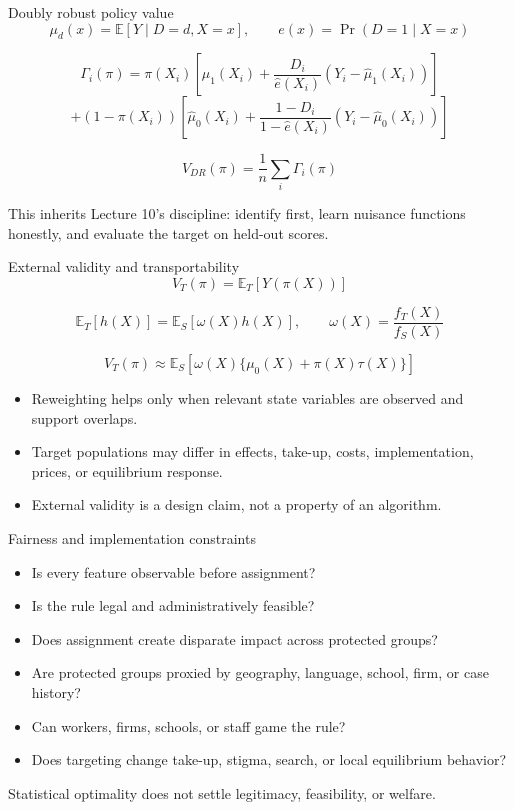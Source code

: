 \documentclass[aspectratio=169,11pt]{beamer}
\newcommand{\E}{\mathbb{E}}
\newcommand{\1}{\mathbf{1}}
\newcommand{\Prb}{\operatorname{Pr}}
\begin{document}
\begin{frame}{Doubly robust policy value}
\small
\[
\mu_d(x)=\E[Y\mid D=d,X=x],
\qquad
e(x)=\Prb(D=1\mid X=x)
\]

\[
\Gamma_i(\pi)=
\pi(X_i)\left[\widehat\mu_1(X_i)+
\frac{D_i}{\widehat e(X_i)}(Y_i-\widehat\mu_1(X_i))\right]
\]
\[
+(1-\pi(X_i))\left[\widehat\mu_0(X_i)+
\frac{1-D_i}{1-\widehat e(X_i)}(Y_i-\widehat\mu_0(X_i))\right]
\]

\[
\widehat V_{DR}(\pi)=\frac{1}{n}\sum_i\Gamma_i(\pi)
\]

\medskip
This inherits Lecture 10's discipline: identify first, learn nuisance functions honestly, and evaluate the target on held-out scores.
\end{frame}

\begin{frame}{External validity and transportability}
\small
\[
V_T(\pi)=\E_T[Y(\pi(X))]
\]

\[
\E_T[h(X)] = \E_S[\omega(X)h(X)],
\qquad
\omega(X)=\frac{f_T(X)}{f_S(X)}
\]

\[
V_T(\pi)\approx
\E_S\left[\omega(X)\{\mu_0(X)+\pi(X)\tau(X)\}\right]
\]

\begin{itemize}
    \item Reweighting helps only when relevant state variables are observed and support overlaps.
    \item Target populations may differ in effects, take-up, costs, implementation, prices, or equilibrium response.
    \item External validity is a design claim, not a property of an algorithm.
\end{itemize}
\end{frame}

\begin{frame}{Fairness and implementation constraints}
\small
\begin{itemize}
    \item Is every feature observable before assignment?
    \item Is the rule legal and administratively feasible?
    \item Does assignment create disparate impact across protected groups?
    \item Are protected groups proxied by geography, language, school, firm, or case history?
    \item Can workers, firms, schools, or staff game the rule?
    \item Does targeting change take-up, stigma, search, or local equilibrium behavior?
\end{itemize}

\medskip
Statistical optimality does not settle legitimacy, feasibility, or welfare.
\end{frame}
\end{document}
